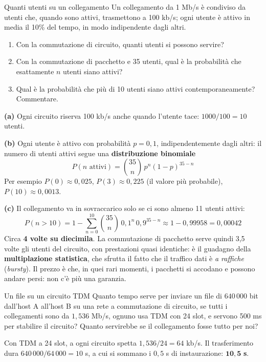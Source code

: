 \begin{esercizio}{Quanti utenti su un collegamento}
Un collegamento da 1 Mb/s è condiviso da utenti che, quando sono attivi, trasmettono a 100 kb/s; ogni utente è attivo in
media il 10\% del tempo, in modo indipendente dagli altri.
\begin{enumerate}[label=(\alph*)]
    \item Con la commutazione di circuito, quanti utenti si possono servire?
    \item Con la commutazione di pacchetto e 35 utenti, qual è la probabilità che esattamente $n$ utenti siano attivi?
    \item Qual è la probabilità che più di 10 utenti siano attivi contemporaneamente? Commentare.
\end{enumerate}
\end{esercizio}

\svolgimento
\textbf{(a)} Ogni circuito riserva 100 kb/s anche quando l'utente tace: $1000/100 = 10$ utenti.

\textbf{(b)} Ogni utente è attivo con probabilità $p = 0{,}1$, indipendentemente dagli altri: il numero di utenti attivi segue
una \textbf{distribuzione binomiale}
$$P(n \text{ attivi}) = \binom{35}{n}\, p^n (1-p)^{35-n}$$
Per esempio $P(0) \approx 0{,}025$, $P(3) \approx 0{,}225$ (il valore più probabile), $P(10) \approx 0{,}0013$.

\textbf{(c)} Il collegamento va in sovraccarico solo se ci sono almeno 11 utenti attivi:
$$P(n > 10) = 1 - \sum_{n=0}^{10} \binom{35}{n}\, 0{,}1^n\, 0{,}9^{35-n} \approx 1 - 0{,}99958 = 0{,}00042$$
Circa \textbf{4 volte su diecimila}. La commutazione di pacchetto serve quindi 3,5 volte gli utenti del circuito, con prestazioni
quasi identiche: è il guadagno della \textbf{multiplazione statistica}, che sfrutta il fatto che il traffico dati è
\emph{a raffiche} (\emph{bursty}). Il prezzo è che, in quei rari momenti, i pacchetti si accodano e possono andare persi: non c'è
più una garanzia.

\begin{esercizio}{Un file su un circuito TDM}
Quanto tempo serve per inviare un file di $640\,000$ bit dall'host A all'host B su una rete a commutazione di circuito, se tutti
i collegamenti sono da $1{,}536$ Mb/s, ognuno usa TDM con 24 slot, e servono 500 ms per stabilire il circuito? Quanto
servirebbe se il collegamento fosse tutto per noi?
\end{esercizio}

\svolgimento
Con TDM a 24 slot, a ogni circuito spetta $1{,}536 / 24 = 64$ kb/s. Il trasferimento dura
$640\,000 / 64\,000 = 10$ s, a cui si sommano i $0{,}5$ s di instaurazione: $\mathbf{10{,}5}$ \textbf{s}.


